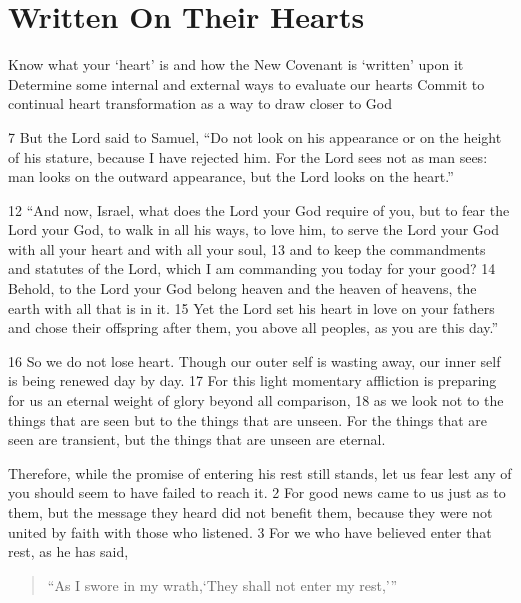 \chapter{Written On Their Hearts}

\begin{goals}
\goal Know what your `heart' is and how the New Covenant is `written' upon it
\goal Determine some internal and external ways to evaluate our hearts
\goal Commit to continual heart transformation as a way to draw closer to God
\end{goals}

\begin{bible}
7 But the Lord said to Samuel, ``Do not look on his appearance or on the height of his stature, because I have rejected him. For the Lord sees not as man sees: man looks on the outward appearance, but the Lord looks on the heart.''

12 ``And now, Israel, what does the Lord your God require of you, but to fear the Lord your God, to walk in all his ways, to love him, to serve the Lord your God with all your heart and with all your soul, 13 and to keep the commandments and statutes of the Lord, which I am commanding you today for your good? 14 Behold, to the Lord your God belong heaven and the heaven of heavens, the earth with all that is in it. 15 Yet the Lord set his heart in love on your fathers and chose their offspring after them, you above all peoples, as you are this day.''

16 So we do not lose heart. Though our outer self is wasting away, our inner self is being renewed day by day. 17 For this light momentary affliction is preparing for us an eternal weight of glory beyond all comparison, 18 as we look not to the things that are seen but to the things that are unseen. For the things that are seen are transient, but the things that are unseen are eternal.

Therefore, while the promise of entering his rest still stands, let us fear lest any of you should seem to have failed to reach it. 2 For good news came to us just as to them, but the message they heard did not benefit them, because they were not united by faith with those who listened. 3 For we who have believed enter that rest, as he has said,

\begin{quote}
``As I swore in my wrath,`They shall not enter my rest,'\thinspace''
\end{quote}


\end{bible}
